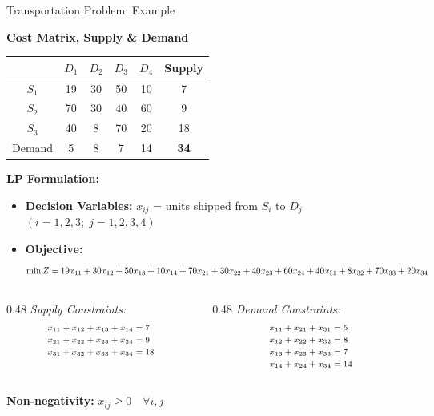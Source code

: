 \documentclass{beamer}
\begin{document}
\begin{frame}{Transportation Problem: Example}
\tiny %

\textbf{Cost Matrix, Supply \& Demand}
\vspace{0.1cm}
\begin{center}
\scriptsize  %
\begin{tabular}{c|cccc|c}
     & $D_1$ & $D_2$ & $D_3$ & $D_4$ & Supply \\ \hline
$S_1$ & 19 & 30 & 50 & 10 & 7 \\
$S_2$ & 70 & 30 & 40 & 60 & 9 \\
$S_3$ & 40 & 8  & 70 & 20 & 18 \\ \hline
Demand & 5  & 8  & 7  & 14 & \textbf{34}
\end{tabular}
\end{center}

\vspace{0.2cm}
\textbf{LP Formulation:}
\begin{itemize}
    \item \textbf{Decision Variables:} $x_{ij}$ = units shipped from $S_i$ to $D_j$ \quad $(i=1,2,3;\; j=1,2,3,4)$
    \item \textbf{Objective:} 
    \[
    \scriptsize  %
    \min Z = 19x_{11} + 30x_{12} + 50x_{13} + 10x_{14} + 70x_{21} + 30x_{22} + 40x_{23} + 60x_{24} + 40x_{31} + 8x_{32} + 70x_{33} + 20x_{34}
    \]
\end{itemize}

\vspace{-0.2cm}  %
\begin{columns}[T]
\begin{column}{0.48\textwidth}
\textit{Supply Constraints:}
\[
\scriptsize
\begin{aligned}
x_{11} + x_{12} + x_{13} + x_{14} &= 7 \\
x_{21} + x_{22} + x_{23} + x_{24} &= 9 \\
x_{31} + x_{32} + x_{33} + x_{34} &= 18
\end{aligned}
\]
\end{column}
\begin{column}{0.48\textwidth}
\textit{Demand Constraints:}
\[
\scriptsize
\begin{aligned}
x_{11} + x_{21} + x_{31} &= 5 \\
x_{12} + x_{22} + x_{32} &= 8 \\
x_{13} + x_{23} + x_{33} &= 7 \\
x_{14} + x_{24} + x_{34} &= 14
\end{aligned}
\]
\end{column}
\end{columns}
\vspace{-0.1cm}
\centering \textbf{Non-negativity:} $x_{ij} \geq 0 \quad \forall i,j$
\end{frame}
\end{document}
